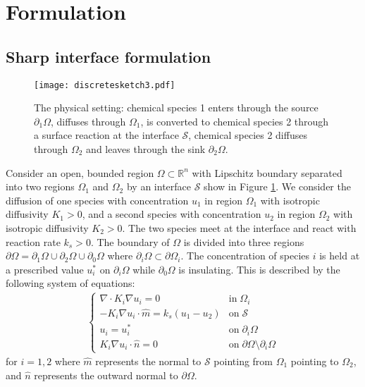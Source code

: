 \documentclass[11pt]{article}
\begin{document}
\section{Formulation} \label{sec:formulation}

\subsection{Sharp interface formulation} \label{sec:sharp}
\begin{figure}\label{fig:domain}
\centering
\texttt{[image: discretesketch3.pdf]}
\caption{The physical setting: chemical species 1 enters through the source $\partial_1\Omega$, diffuses through $\Omega_1$, is converted to chemical species 2 through a surface reaction at the interface $\mathcal{S}$, chemical species 2 diffuses through $\Omega_2$ and leaves through the sink $\partial_2\Omega$.}
\end{figure}

Consider an open, bounded region $\Omega \subset {\mathbb R}^n$ with Lipschitz boundary separated into two regions $\Omega_1$ and $\Omega_2$ by an interface $\mathcal{S}$ show in Figure \ref{fig:domain}.   We consider the diffusion of one species with concentration $u_1$ in region $\Omega_1$ with isotropic diffusivity $K_1>0$, and a second species with concentration $u_2$ in region $\Omega_2$ with isotropic diffusivity $K_2>0$.  The two species meet at the interface and react with reaction rate $k_s >0$.  The boundary of $\Omega$ is divided into three regions $\partial \Omega = \partial_1 \Omega \cup  \partial_2 \Omega \cup  \partial_0 \Omega$ where $\partial_i \Omega \subset \partial \Omega_i$.  The concentration of species $i$ is held at a prescribed value $u_i^*$ on $\partial_i \Omega$ while $\partial_0 \Omega$ is insulating.  
This is described by the following system of equations:
\begin{align} \label{eq:sharp}
\begin{cases}
\nabla\cdot K_i \nabla u_i=0 \quad &\text{in}\;\Omega_i\\
-K_i\nabla u_i\cdot \hat{m}=k_s(u_1-u_2) &\text{on}\;\mathcal{S}\\
u_i=u_i^* &\text{on}\;\partial_{i}\Omega\\
K_i\nabla u_i\cdot \hat{n}=0&\text{on}\;\partial\Omega\setminus\partial_i\Omega
\end{cases}
\end{align}
for $i=1,2$ where $\hat{m}$ represents the normal to $\mathcal{S}$ pointing from $\Omega_1$ pointing to $\Omega_2$, and $\hat{n}$ represents the outward normal to $\partial\Omega$.
\end{document}
